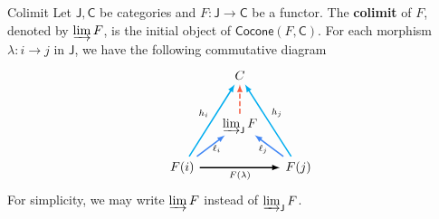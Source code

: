 \begin{definition}{Colimit}{}
    Let $\mathsf{J},\mathsf{C}$ be categories and $F:\mathsf{J}\to\mathsf{C}$ be a functor. 
    The \textbf{colimit} of $F$, denoted by $\varinjlim F$, is the initial object of $\mathsf{Cocone}(F,\textsf{C})$. For each morphism $\lambda:i\to j$ in $\mathsf{J}$, we have the following commutative diagram
    \[
        \begin{tikzcd}[ampersand replacement=\&, every arrow/.append style={-latex, line width=1.1pt}]
            \&   [-1.5em]                \&[-1em] C \& [-1em]                  \\[+0.2cm]
            \&                   \& \varinjlim_\mathsf{J} F \arrow[u, dash pattern=on 4pt off 2pt, draw=arrowRed]         \&                   \\[-0.1cm]
        \& F(i) \arrow[ruu, draw=cyan, "h_i"]\arrow[ru, draw=arrowBlue, shorten >=-3.5pt, "\ell_i"' yshift=4.5pt]        \arrow[rr, "F(\lambda)"']\&   \& F(j)\arrow[luu, draw=cyan, "h_j"']\arrow[lu, draw=arrowBlue, shorten >=-3.7pt, "\ell_j" yshift=4.5pt] 
        \end{tikzcd}
    \]
    For simplicity, we may write $\varinjlim F$  instead of $\varinjlim_\mathsf{J} F$.
\end{definition}


